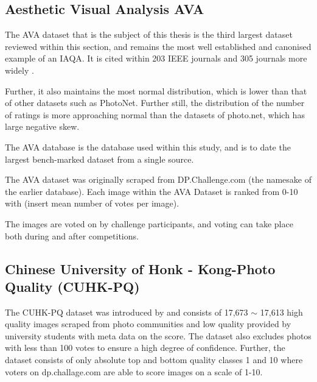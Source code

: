 
\subsection{Aesthetic Visual Analysis AVA}

The AVA dataset that is the subject of this thesis is the third largest dataset reviewed within this section, and remains the most well established and canonised example of an IAQA. It is cited within 203 IEEE journals and 305 journals more widely \cite{AVA2012}. 

Further, it also maintains the most normal distribution, which is lower than that of other datasets such as PhotoNet. Further still, the distribution of the number of ratings is more approaching normal than the datasets of photo.net, which has large negative skew. 

The AVA\cite{Jin2016,Hosu2019,She_2021_CVPR,Lu2015a,Redi2015a,Chen2017,Cui2019,Simond2015,Kang2020,Yang2019,Li2020a, Jin2020, Wu2016,Sheng2018,Ma2017,Liu2017,Mavridaki2015, Aydin2015,Spathis2016} database is the database used within this study, and is to date the largest bench-marked dataset from a single source\cite{Hosu2019,She_2021_CVPR}. 

The AVA dataset was originally scraped from DP.Challenge.com (the namesake of the earlier database).  Each image within the AVA Dataset is ranked from 0-10  with (insert mean number of votes per image). 

The images are voted on by challenge participants, and voting can take place both during and after competitions.


\subsection{Chinese University of Honk - Kong-Photo Quality (CUHK-PQ)}

The CUHK-PQ dataset was introduced by\cite{Tang2013a} and consists of 17,673\cite{Tang2013a}  $\sim$ 17,613\cite{Murray2012} high quality images scraped from photo communities and low quality provided by university students with meta data on the score. The dataset also excludes photos with less than 100 votes to ensure a high degree of confidence. Further, the dataset consists of only absolute top and bottom quality classes {1 and 10} where voters on dp.challage.com are able to score images on a scale of 1-10. 

